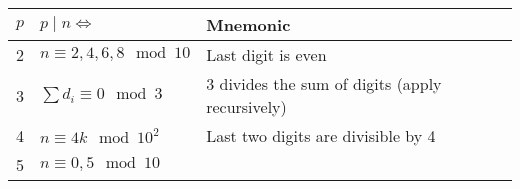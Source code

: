 \begin{longtable}[]{@{}lll@{}}
\toprule
\begin{minipage}[b]{0.30\columnwidth}\raggedright
\(p\)\strut
\end{minipage} & \begin{minipage}[b]{0.30\columnwidth}\raggedright
\(p \mid n \iff\)\strut
\end{minipage} & \begin{minipage}[b]{0.30\columnwidth}\raggedright
Mnemonic\strut
\end{minipage}\tabularnewline
\midrule
\endhead
\begin{minipage}[t]{0.30\columnwidth}\raggedright
2\strut
\end{minipage} & \begin{minipage}[t]{0.30\columnwidth}\raggedright
\(n \equiv 2, 4, 6, 8 \mod 10\)\strut
\end{minipage} & \begin{minipage}[t]{0.30\columnwidth}\raggedright
Last digit is even\strut
\end{minipage}\tabularnewline
\begin{minipage}[t]{0.30\columnwidth}\raggedright
3\strut
\end{minipage} & \begin{minipage}[t]{0.30\columnwidth}\raggedright
\(\sum d_i \equiv 0 \mod 3\)\strut
\end{minipage} & \begin{minipage}[t]{0.30\columnwidth}\raggedright
3 divides the sum of digits (apply recursively)\strut
\end{minipage}\tabularnewline
\begin{minipage}[t]{0.30\columnwidth}\raggedright
4\strut
\end{minipage} & \begin{minipage}[t]{0.30\columnwidth}\raggedright
\(n \equiv 4k \mod 10^2\)\strut
\end{minipage} & \begin{minipage}[t]{0.30\columnwidth}\raggedright
Last two digits are divisible by 4\strut
\end{minipage}\tabularnewline
\begin{minipage}[t]{0.30\columnwidth}\raggedright
5\strut
\end{minipage} & \begin{minipage}[t]{0.30\columnwidth}\raggedright
\(n \equiv 0, 5 \mod 10\)\strut
\end{minipage} & \begin{minipage}[t]{0.30\columnwidth}\raggedright

\end{minipage}
\end{longtable}
